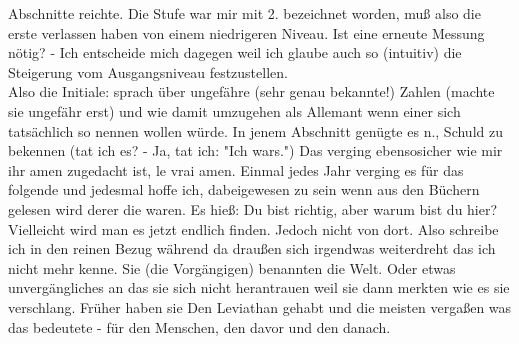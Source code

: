 \documentclass[
]{article}
\begin{document}
\begin{enumerate}
  Abschnitte reichte. Die Stufe war mir mit 2. bezeichnet worden, muß
  also die erste verlassen haben von einem niedrigeren Niveau. Ist eine
  erneute Messung nötig? - Ich entscheide mich dagegen weil ich glaube
  auch so (intuitiv) die Steigerung vom Ausgangsniveau festzustellen.\\
  Also die Initiale: sprach über ungefähre (sehr genau bekannte!) Zahlen
  (machte sie ungefähr erst) und wie damit umzugehen als Allemant wenn
  einer sich tatsächlich so nennen wollen würde. In jenem Abschnitt
  genügte es n., Schuld zu bekennen (tat ich es? - Ja, tat ich: "Ich
  war\textquotesingle s.") Das verging ebensosicher wie mir ihr amen
  zugedacht ist, le vrai amen. Einmal jedes Jahr verging es für das
  folgende und jedesmal hoffe ich, dabeigewesen zu sein wenn aus den
  Büchern gelesen wird derer die waren. Es hieß: Du bist richtig, aber
  warum bist du hier? Vielleicht wird man es jetzt endlich finden.
  Jedoch nicht von dort. Also schreibe ich in den reinen Bezug während
  da draußen sich irgendwas weiterdreht das ich nicht mehr kenne. Sie
  (die Vorgängigen) benannten die Welt. Oder etwas unvergängliches an
  das sie sich nicht herantrauen weil sie dann merkten wie es sie
  verschlang. Früher haben sie Den Leviathan gehabt und die meisten
  vergaßen was das bedeutete - für den Menschen, den davor und den
  danach.
\end{enumerate}
\end{document}
